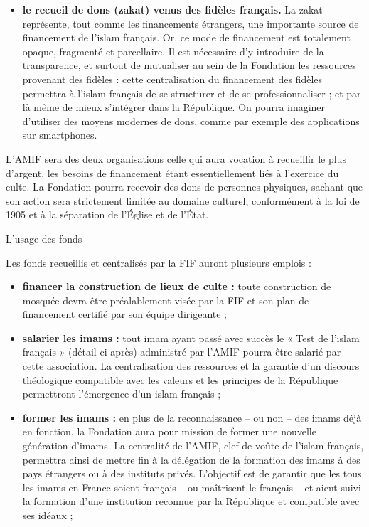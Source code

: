 \begin{itemize}
\item
  \textbf{le recueil de dons (zakat) venus des fidèles français.} La
  zakat représente, tout comme les financements étrangers, une
  importante source de financement de l'islam français. Or, ce mode de
  financement est totalement opaque, fragmenté et parcellaire. Il est
  nécessaire d'y introduire de la transparence, et surtout de mutualiser
  au sein de la Fondation les ressources provenant des fidèles : cette
  centralisation du financement des fidèles permettra à l'islam français
  de se structurer et de se professionnaliser ; et par là même de mieux
  s'intégrer dans la République. On pourra imaginer d'utiliser des
  moyens modernes de dons, comme par exemple des applications sur
  smartphones.
\end{itemize}


L'AMIF sera des deux organisations celle qui aura vocation à recueillir
le plus d'argent, les besoins de financement étant essentiellement liés
à l'exercice du culte. La Fondation pourra recevoir des dons de
personnes physiques, sachant que son action sera strictement limitée au
domaine culturel, conformément à la loi de 1905 et à la séparation de
l'Église et de l'État.


L'usage des fonds


Les fonds recueillis et centralisés par la FIF auront plusieurs emplois
:


\begin{itemize}
\item
  \textbf{financer la construction de lieux de culte :} toute
  construction de mosquée devra être préalablement visée par la FIF et
  son plan de financement certifié par son équipe dirigeante ;
\item
  \textbf{salarier les imams :} tout imam ayant passé avec succès le «
  Test de l'islam français » (détail ci-après) administré par l'AMIF
  pourra être salarié par cette association. La centralisation des
  ressources et la garantie d'un discours théologique compatible avec
  les valeurs et les principes de la République permettront l'émergence
  d'un islam français ;
\item
  \textbf{former les imams :} en plus de la reconnaissance -- ou non --
  des imams déjà en fonction, la Fondation aura pour mission de former
  une nouvelle génération d'imams. La centralité de l'AMIF, clef de
  voûte de l'islam français, permettra ainsi de mettre fin à la
  délégation de la formation des imams à des pays étrangers ou à des
  instituts privés. L'objectif est de garantir que les tous les imams en
  France soient français -- ou maîtrisent le français -- et aient suivi
  la formation d'une institution reconnue par la République et
  compatible avec ses idéaux ;
\end{itemize}


